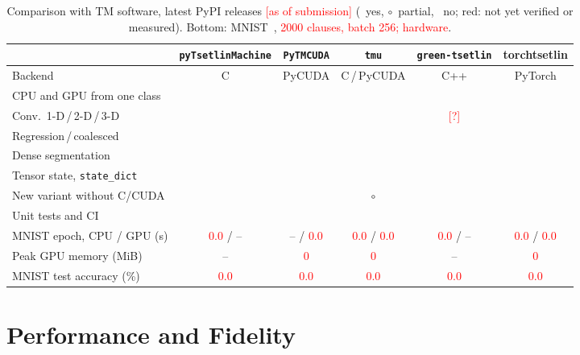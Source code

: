 \documentclass[twoside,11pt]{article}
\newcommand{\ph}[1]{\textcolor{red}{[#1]}}
\newcommand{\res}[1]{\textcolor{red}{#1}}
\newcommand{\code}[1]{\texttt{#1}}
\newcommand{\lib}{\textsf{torchtsetlin}}
\newcommand{\cmark}{\ding{51}}
\newcommand{\xmark}{\ding{55}}
\newcommand{\pmark}{$\circ$}
\begin{document}
\begin{table}[t]
\centering\footnotesize
\setlength{\tabcolsep}{3.5pt}
\caption{Comparison with TM software, latest PyPI releases \ph{as of submission} (\cmark\ yes,
  \pmark\ partial, \xmark\ no; red: not yet verified or measured). Bottom: MNIST~\citep{lecun1998mnist},
  \res{2000 clauses, batch 256; hardware}.}
\label{tab:compare}
\begin{tabular}{@{}lccccc@{}}
\toprule
 & \code{pyTsetlinMachine} & \code{PyTMCUDA} & \code{tmu} & \code{green-tsetlin} & \lib \\
\midrule
Backend                           & C        & PyCUDA     & C\,/\,PyCUDA & C++    & PyTorch \\
CPU and GPU from one class        & \xmark   & \xmark     & \cmark     & \xmark   & \cmark \\
Conv.\ 1-D\,/\,2-D\,/\,3-D        & \xmark\,\cmark\,\xmark & \xmark\,\cmark\,\xmark & \xmark\,\cmark\,\xmark & \ph{?} & \cmark\,\cmark\,\cmark \\
Regression\,/\,coalesced          & \cmark\,\xmark & \cmark\,\xmark & \cmark\,\cmark & \xmark\,\xmark & \cmark\,\cmark \\
Dense segmentation                & \xmark   & \xmark     & \xmark     & \xmark   & \cmark \\
Tensor state, \code{state\_dict}  & \xmark   & \xmark     & \xmark     & \xmark   & \cmark \\
New variant without C/CUDA        & \xmark   & \xmark     & \pmark     & \xmark   & \cmark \\
Unit tests and CI                 & \xmark   & \xmark     & \cmark     & \cmark   & \cmark \\
\midrule
MNIST epoch, CPU / GPU (s)        & \res{0.0} / --  & -- / \res{0.0} & \res{0.0} / \res{0.0} & \res{0.0} / -- & \res{0.0} / \res{0.0} \\
Peak GPU memory (MiB)             & --        & \res{0}   & \res{0}    & --        & \res{0} \\
MNIST test accuracy (\%)          & \res{0.0} & \res{0.0} & \res{0.0}  & \res{0.0} & \res{0.0} \\
\bottomrule
\end{tabular}
\end{table}

\section{Performance and Fidelity}
\label{sec:performance}
\end{document}
